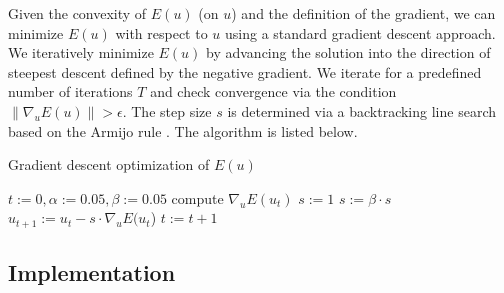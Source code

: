 \documentclass{paper}
\begin{document}

Given the convexity of \begin{math}E(u)\end{math} (on \begin{math}u\end{math}) and the definition of the gradient, we can minimize \begin{math}E(u)\end{math} with respect to \begin{math}u\end{math} using a standard gradient descent approach. We iteratively minimize \begin{math}E(u)\end{math} by advancing the solution into the direction of steepest descent defined by the negative gradient. We iterate for a predefined number of iterations \begin{math}T\end{math} and check convergence via the condition \begin{math}\left\|\nabla_{u} E(u)\right\|>\epsilon\end{math}. The step size \begin{math}s\end{math} is determined via a backtracking line search based on the Armijo rule \cite{diego66}. The algorithm is listed below.

\begin{algorithm}
\caption{Gradient descent optimization of $E(u)$}
\begin{algorithmic}
 \State $t:=0,\alpha:=0.05,\beta:=0.05$
   \State compute $\nabla_{u}E(u_{t})$
   \State $s:=1$
    \State   $s := \beta \cdot s$
   \EndWhile
    \State $u_{t+1} := u_{t} - s \cdot \nabla_{u}E(u_{t}$)
    \State $t := t + 1$
\EndWhile
\end{algorithmic}
\end{algorithm}

\subsection{Implementation}
\end{document}
